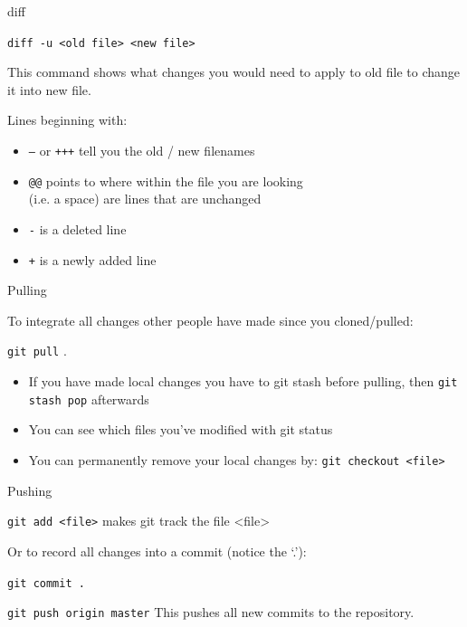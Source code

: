 \documentclass{beamer}
\begin{document}
\begin{frame}{diff}

\texttt{diff -u <old file> <new file>} 

This command shows what changes you would need to apply to old file to change it into
new file.

Lines beginning with:
\begin{itemize}
 \item \texttt{---} or \texttt{+++} tell you the old / new filenames
 \item \texttt{@@} points to where within the file you are looking \\
       (i.e. a space) are lines that are unchanged
 \item \texttt{-} is a deleted line
 \item \texttt{+} is a newly added line
\end{itemize}

\end{frame}


\begin{frame}{Pulling}

To integrate all changes other people have made since you
cloned/pulled:

\texttt{git pull} .

\begin{itemize}
 \item If you have made local changes you have to git stash before
pulling, then \texttt{git stash pop} afterwards
\item You can see which files you’ve modified with git status
\item You can permanently remove your local changes by: \texttt{git
checkout <file>}
\end{itemize}

\end{frame}






\begin{frame}{Pushing}

\texttt{git add <file>} makes git track the file <file> 

Or to record all changes into a commit (notice the ‘.’):

\texttt{git commit .} 

\texttt{git push origin master} This pushes all new commits to the repository.


\end{frame}
\end{document}
